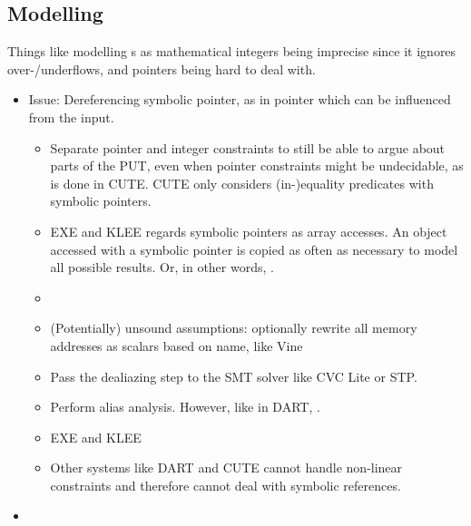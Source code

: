 \documentclass{article}
\begin{document}
\begin{multicols}{2}
    \subsection{Modelling}
    Things like modelling s as mathematical integers being imprecise since it ignores over-/underflows, and pointers being hard to deal with.
    \begin{itemize}
        \item Issue: Dereferencing symbolic pointer, as in pointer which can be influenced from the input.
              \begin{itemize}
                  \item Separate pointer and integer constraints to still be able to argue about parts of the PUT, even when pointer constraints might be undecidable, as is done in CUTE\cite{CUTE}. CUTE only considers (in-)equality predicates with symbolic pointers.
                  \item EXE\cite{EXE} and KLEE\cite{KLEE} regards symbolic pointers as array accesses. An object accessed with a symbolic pointer is copied as often as necessary to model all possible results. Or, in other words, \cite{AllYouEverWanted}.
                  \item {}\cite{AllYouEverWanted}
                  \item (Potentially) unsound assumptions: optionally rewrite all memory addresses as scalars based on name, like Vine\cite{BitBlaze}
                  \item Pass the dealiazing step to the SMT solver like CVC Lite\cite{CVCLite} or STP\cite{STP}.
                  \item Perform alias analysis. However, like in DART\cite{DART}, \cite{AllYouEverWanted}.
                  \item EXE\cite{EXE} and KLEE\cite{KLEE} \cite{AllYouEverWanted}
                  \item Other systems like DART\cite{DART} and CUTE\cite{CUTE} cannot handle non-linear constraints and therefore cannot deal with symbolic references.
              \end{itemize}
        \item {}\cite{ReviewThreeDecades}
    \end{itemize}


\end{multicols}
\end{document}

